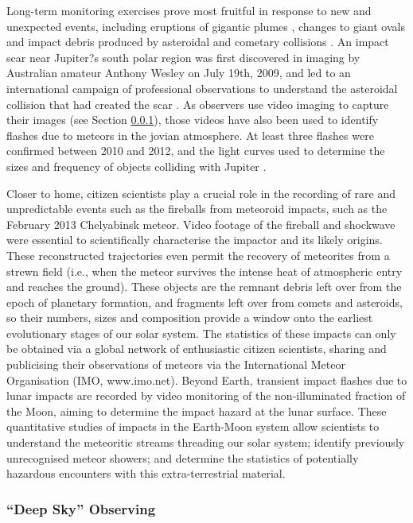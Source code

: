 \documentclass{ar2e}
\begin{document}
Long-term monitoring exercises prove most fruitful in response to new and
unexpected events, including eruptions of gigantic plumes \citep{08sanchez,
11fletcher}, changes to giant ovals \citep{06simon-miller} and impact debris
produced by asteroidal and cometary collisions \citep{10hammel}.  An impact
scar near Jupiter?s south polar region was first discovered in imaging by
Australian amateur Anthony Wesley on July 19th, 2009, and led to an
international campaign of professional observations to understand the
asteroidal collision that had created the scar
\citep[e.g.,][]{10depater,11orton}.  As observers use video imaging to capture
their images (see Section \ref{}), those videos have also been used to
identify flashes due to meteors in the jovian atmosphere.  At least three
flashes were confirmed between 2010 and 2012, and the light curves used to
determine the sizes and frequency of objects colliding with Jupiter
\citep[e.g.,][]{10hueso}. 

Closer to home, citizen scientists play a crucial role in the recording of
rare and unpredictable events such as the fireballs from meteoroid impacts,
such as the February 2013 Chelyabinsk meteor.  Video footage of the fireball
and shockwave were essential to scientifically characterise the impactor and
its likely origins.  These reconstructed trajectories even permit the recovery
of meteorites from a strewn field (i.e., when the meteor survives the intense
heat of atmospheric entry and reaches the ground).  These objects are the
remnant debris left over from the epoch of planetary formation, and fragments
left over from comets and asteroids, so their numbers, sizes and composition
provide a window onto the earliest evolutionary stages of our solar system. 
The statistics of these impacts can only be obtained via a global network of
enthusiastic citizen scientists, sharing and publicising their observations of
meteors via the International Meteor Organisation (IMO, www.imo.net).  Beyond
Earth, transient impact flashes due to lunar impacts are recorded by video
monitoring of the non-illuminated fraction of the Moon, aiming to determine
the impact hazard at the lunar surface.  These quantitative studies of impacts
in the Earth-Moon system allow scientists to understand the meteoritic streams
threading our solar system; identify previously unrecognised meteor showers;
and determine the statistics of potentially hazardous encounters with this
extra-terrestrial material. 
 
 
\subsubsection{``Deep Sky'' Observing}
\end{document}
